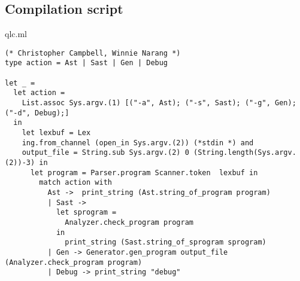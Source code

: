      \subsection{Compilation script}
qlc.ml

\begin{lstlisting}
(* Christopher Campbell, Winnie Narang *)
type action = Ast | Sast | Gen | Debug

let _ =
  let action =
    List.assoc Sys.argv.(1) [("-a", Ast); ("-s", Sast); ("-g", Gen); ("-d", Debug);]
  in
    let lexbuf = Lex
    ing.from_channel (open_in Sys.argv.(2)) (*stdin *) and
    output_file = String.sub Sys.argv.(2) 0 (String.length(Sys.argv.(2))-3) in
      let program = Parser.program Scanner.token  lexbuf in
        match action with 
          Ast ->  print_string (Ast.string_of_program program)
          | Sast -> 
            let sprogram =
              Analyzer.check_program program
            in
              print_string (Sast.string_of_sprogram sprogram)
          | Gen -> Generator.gen_program output_file (Analyzer.check_program program)
          | Debug -> print_string "debug"

\end{lstlisting}


